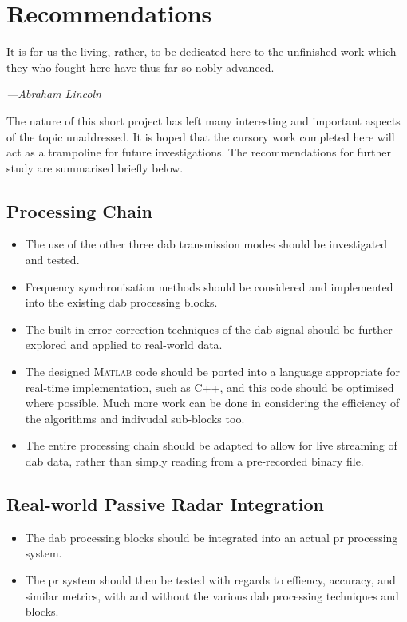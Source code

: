 \documentclass[class=report,11pt,crop=false]{standalone}
\begin{document}
\chapter{Recommendations \label{ch:recommendations}}
\epigraph{It is for us the living, rather, to be dedicated here to the unfinished work which they who fought here have thus far so nobly advanced.}%
    {\emph{---Abraham Lincoln}}
\vspace{0.5cm}

The nature of this short project has left many interesting and important aspects of the topic unaddressed. It is hoped that the cursory work completed here will act as a trampoline for future investigations. The recommendations for further study are summarised briefly below.

\section{ Processing Chain}
\begin{itemize}
    \item The use of the other three \gls{dab} transmission modes should be investigated and tested.
    \item Frequency synchronisation methods should be considered and implemented into the existing \gls{dab} processing blocks.
    \item The built-in error correction techniques of the \gls{dab} signal should be further explored and applied to real-world data.
    \item The designed \textsc{Matlab} code should be ported into a language appropriate for real-time implementation, such as \textsc{C++}, and this code should be optimised where possible. Much more work can be done in considering the efficiency of the algorithms and indivudal sub-blocks too.
    \item The entire processing chain should be adapted to allow for live streaming of \gls{dab} data, rather than simply reading from a pre-recorded binary file.
\end{itemize}

\section{Real-world Passive Radar Integration}
\begin{itemize}
    \item The \gls{dab} processing blocks should be integrated into an actual \gls{pr} processing system.
    \item The \gls{pr} system should then be tested with regards to effiency, accuracy, and similar metrics, with and without the various \gls{dab} processing techniques and blocks.
\end{itemize}





\ifstandalone

\printnoidxglossary[type=\acronymtype,nonumberlist]
\fi
\end{document}

